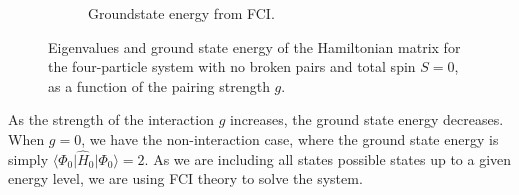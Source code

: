 \begin{figure}[htbp]
\begin{subfigure}[b]{0.46\linewidth}
        \caption{
            Groundstate energy from FCI.\label{fig:b_groundstate}
        }
    \end{subfigure}
    \caption{
        Eigenvalues and ground state energy of the Hamiltonian matrix for the four-particle system with no broken pairs and total spin $S = 0$, as a function of the pairing strength $g$.
    }
\end{figure}

As the strength of the interaction $g$ increases, the ground state energy decreases.
When $g = 0$, we have the non-interaction case, where the ground state energy is simply $\langle \Phi_0 \vert \hat{H}_0 \vert \Phi_0 \rangle = 2$.
As we are including all states possible states up to a given energy level, we are using FCI theory to solve the system.
